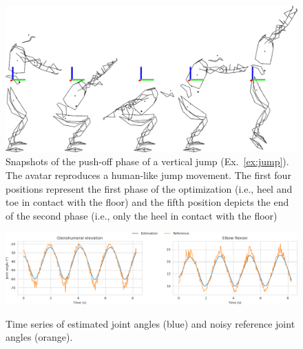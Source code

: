 \begin{figure}[t!]
\includegraphics[width=\columnwidth]{figures/kinogramme_jump}
\caption{Snapshots of the push-off phase of a vertical jump (Ex.~\ref{ex:jump}). The avatar reproduces a human-like jump movement. The first four positions represent the first phase of the optimization (i.e., heel and toe in contact with the floor) and the fifth position depicts the end of the second phase (i.e., only the heel in contact with the floor)} 
\label{fig:graph_force_vitesse_longueur}
\end{figure}

\begin{figure}[t!] 
\centering 
\includegraphics[width=\textwidth]{figures/joint_angles_MHE.pdf}\\ 
\caption{Time series of estimated joint angles (blue) and noisy reference joint angles (orange).} 
\label{fig:joint_angles_MHE} 
\end{figure} 

